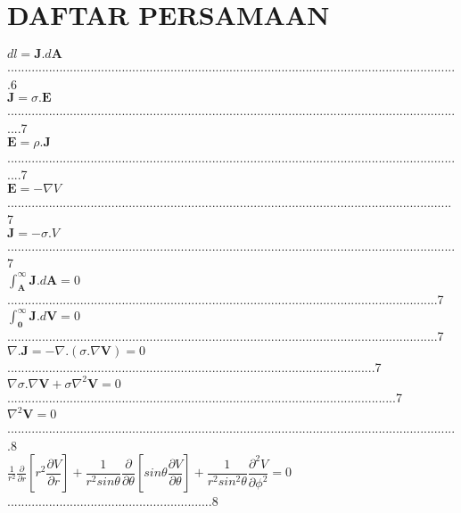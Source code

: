  \chapter*{DAFTAR PERSAMAAN}

$dl=\textbf{J}.d\textbf{A}$..................................................................................................................................6\\
$\textbf{J} = \sigma.\textbf{E}$.....................................................................................................................................7\\
$\textbf{E} = \rho.\textbf{J}$.....................................................................................................................................7\\
$\textbf{E} = -\nabla V$................................................................................................................................7\\
$\textbf{J} = -\sigma.V$.................................................................................................................................7\\
$\int_{\textbf{A}}^{\infty} \textbf{J}.d\textbf{A}=0$............................................................................................................................7\\
$\int_{\textbf{0}}^{\infty} \textbf{J}.d\textbf{V}=0$............................................................................................................................7\\
$\nabla.\textbf{J}= - \nabla.(\sigma.\nabla\textbf{V})=0$..........................................................................................................7\\
$\nabla\sigma.\nabla\textbf{V} + \sigma\nabla^2\textbf{V}=0$................................................................................................................7\\
$\nabla^2\textbf{V}=0$..................................................................................................................................8\\
$\frac{1}{r^2}\frac{\partial}{{\partial}r}[r^2\dfrac{{\partial}V}{{\partial}r}]+\dfrac{1}{{r^2}sin\theta} \dfrac{\partial}{{\partial}\theta}[sin\theta\dfrac{{\partial}V}{{\partial}\theta}]+\dfrac{1}{{r^2}{sin^2 \theta}}\dfrac{{\partial}^2V}{{\partial}\phi^2}=0$...........................................................8\\
